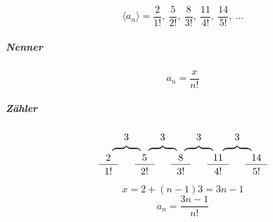 \begin{uebung}
	\begin{question}
		\[
			\langle a_n \rangle = \frac{2}{1!},\ \frac{5}{2!},\ \frac{8}{3!},\ \frac{11}{4!},\ \frac{14}{5!},\ \ldots
		\]
	\end{question}

	\begin{solution}
		\subparagraph{Nenner}
		\[
			a_n = \frac{x}{n!}
		\]
		\subparagraph{Zähler}
		\[
			\begin{tabular}{ccccccccccccc}
				   & 3    &    & 3    &    & 3    &    & 3                  \\[-3pt]
				   & \obf &    & \obf &    & \obf &    & \obf               \\
				2  &      & 5  &      & 8  &      & 11 &      & 14          \\
				\cline{1-1} \cline{3-3} \cline{5-5} \cline{7-7} \cline{9-9} \\[-10pt]
				1! &      & 2! &      & 3! &      & 4! &      & 5!          \\
			\end{tabular}
		\]
		\[
			x = 2 + (n-1) 3 = 3n - 1
		\]
		\[
			a_n = \frac{3n - 1}{n!}
		\]
	\end{solution}
\end{uebung}
